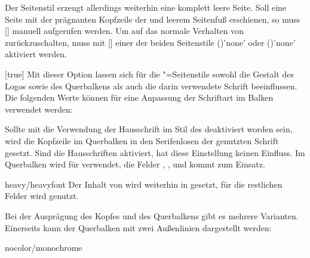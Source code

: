 \begin{Declaration*}{}
\begin{Declaration*}{}
\begin{Declaration*}{}
\begin{Declaration}[v2.02]{}
\begin{Declaration}[v2.02]{}
\begin{Declaration}[v2.02]{}
Der Seitenstil  erzeugt allerdings weiterhin eine komplett 
leere Seite. Soll eine Seite mit der prägnanten Kopfzeile der \TnUD und leerem 
Seitenfuß erschienen, so muss []
manuell aufgerufen werden. Um auf das normale Verhalten von \KOMAScript{} 
zurückzuschalten, muss mit [] einer der 
beiden Seitenstile ()'none'
oder ()'none' aktiviert 
werden.
%
\end{Declaration}
\end{Declaration}
\end{Declaration}

\begin{Declaration}[%
  v2.03;%
  v2.04!\Option{cdhead=barcolor}:nur farbig abgesetzter Querbalken;%
  v2.05!\Option{cdhead=date}:Datum zwischen Kopf- und Textbereich;%
]{}[true]
\printdeclarationlist%
%
%
%
%
%
Mit dieser Option lassen sich für die "=Seitenstile 
sowohl die Gestalt des Logos sowie des Querbalkens als auch die darin 
verwendete Schrift beeinflussen. Die folgenden Werte können für eine Anpassung 
der Schriftart im Balken verwendet werden:
%
\begin{values}{}
\itemfalse
  Sollte mit  die Verwendung der Hausschrift im Stil des 
  \TUDCDs deaktiviert worden sein, wird die Kopfzeile im Querbalken in den 
  Serifenlosen der genutzten Schrift gesetzt. Sind die Hausschriften aktiviert, 
  hat diese Einstellung keinen Einfluss.
  Im Querbalken wird für   verwendet, 
  die Felder , ,  und 
   kommt  zum Einsatz.
\item[heavy/heavyfont]
  Der Inhalt von  wird weiterhin in  
  gesetzt, für die restlichen Felder wird  genutzt.
\end{values}
%
Bei der Ausprägung des Kopfes und des Querbalkens gibt es mehrere Varianten. 
Einerseits kann der Querbalken mit zwei Außenlinien dargestellt werden:
%
\begin{values}{}
\item[nocolor/monochrome]

\end{values}
\end{Declaration}
\end{Declaration*}
\end{Declaration*}
\end{Declaration*}
